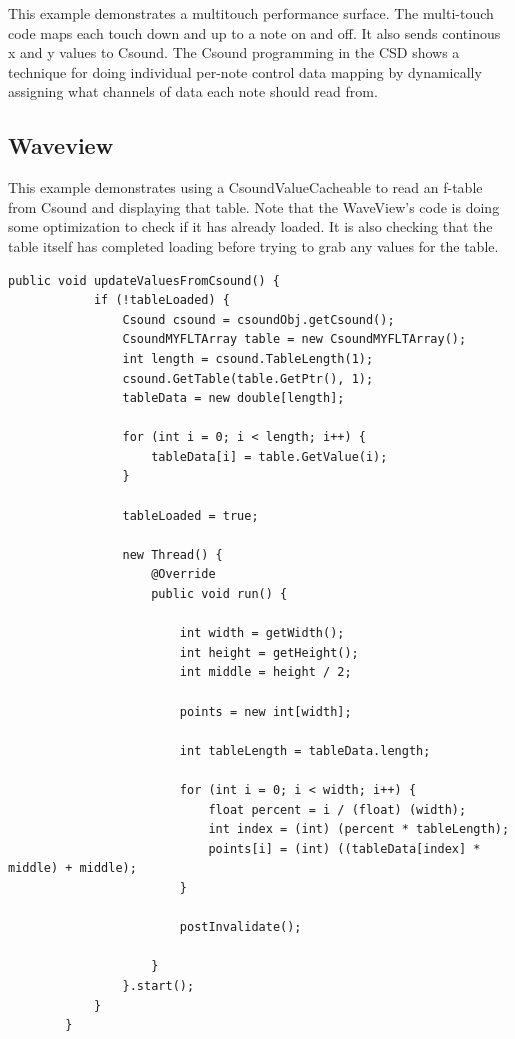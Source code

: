 \documentclass[11pt]{article}
\begin{document}
This example demonstrates a multitouch performance surface. The multi-touch code maps each touch down and up to a note on and off.  It also sends continous x and y values to Csound.  The Csound programming in the CSD shows a technique for doing individual per-note control data mapping by dynamically assigning what channels of data each note should read from. 

\subsection{Waveview}

This example demonstrates using a CsoundValueCacheable to read an f-table from Csound and displaying that table.  Note that the WaveView's code is doing some optimization to check if it has already loaded.  It is also checking that the table itself has completed loading before trying to grab any values for the table. 

\begin{lstlisting}[caption=Waveview code demonstrating reading f-tables from Csound]
		public void updateValuesFromCsound() {
			if (!tableLoaded) {
				Csound csound = csoundObj.getCsound();
				CsoundMYFLTArray table = new CsoundMYFLTArray();
				int length = csound.TableLength(1);
				csound.GetTable(table.GetPtr(), 1);
				tableData = new double[length];

				for (int i = 0; i < length; i++) {
					tableData[i] = table.GetValue(i);
				}

				tableLoaded = true;

				new Thread() {
					@Override
					public void run() {

						int width = getWidth();
						int height = getHeight();
						int middle = height / 2;

						points = new int[width];

						int tableLength = tableData.length;

						for (int i = 0; i < width; i++) {
							float percent = i / (float) (width);
							int index = (int) (percent * tableLength);
							points[i] = (int) ((tableData[index] * middle) + middle);
						}

						postInvalidate();

					}
				}.start();
			}
		}
\end{lstlisting}



\end{document}

